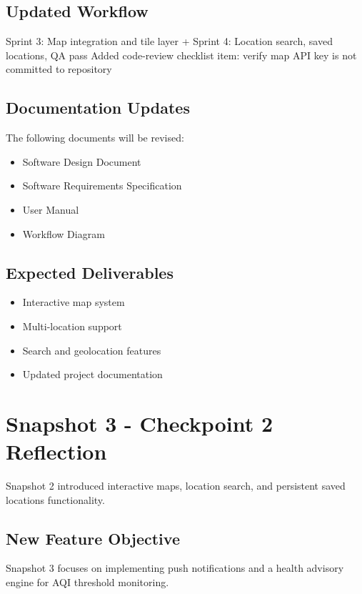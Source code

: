 \documentclass[12pt]{article}
\begin{document}
\subsection {Updated Workflow}
Sprint 3: Map integration and tile layer + Sprint 4: Location search, saved locations, QA pass
Added code-review checklist item: verify map API key is not committed to repository


\subsection{Documentation Updates}

The following documents will be revised:

\begin{itemize}
    \item Software Design Document
    \item Software Requirements Specification
    \item User Manual
    \item Workflow Diagram
\end{itemize}

\subsection{Expected Deliverables}

\begin{itemize}
    \item Interactive map system
    \item Multi-location support
    \item Search and geolocation features
    \item Updated project documentation
\end{itemize}
\newpage

\section{Snapshot 3 - Checkpoint 2 Reflection}

Snapshot 2 introduced interactive maps, location search,
and persistent saved locations functionality.

\subsection{New Feature Objective}

Snapshot 3 focuses on implementing push notifications and
a health advisory engine for AQI threshold monitoring.
\end{document}
